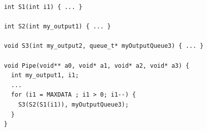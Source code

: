 
\begin{lstlisting}[caption=Clean Sequential Simple Pipeline Code, frame=single, label=lst:pipeClean]
int S1(int i1) { ... }

int S2(int my_output1) { ... }

void S3(int my_output2, queue_t* myOutputQueue3) { ... }

void Pipe(void** a0, void* a1, void* a2, void* a3) {
  int my_output1, i1;
  ...
  for (i1 = MAXDATA ; i1 > 0; i1--) {
    S3(S2(S1(i1)), myOutputQueue3);
  }
}
\end{lstlisting}





